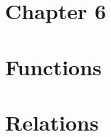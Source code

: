 \documentclass[12pt, letterpaper]{article}
\begin{document}
\section{Chapter 6}

\pagebreak

\section{Functions}





\section{Relations}

\end{document}
